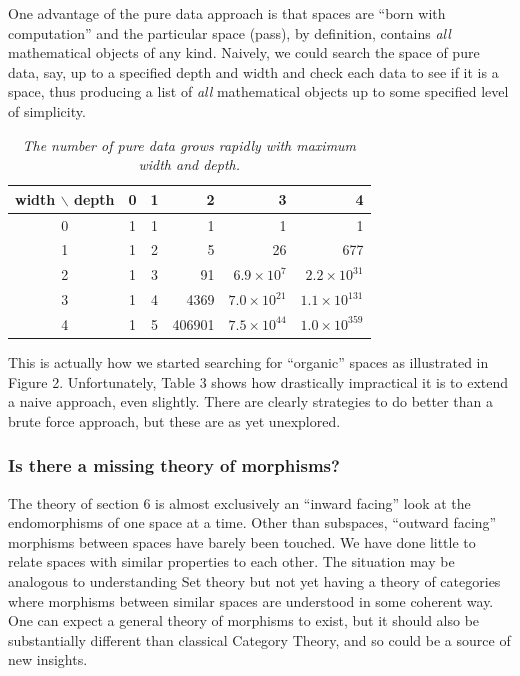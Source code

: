 \documentclass[11pt]{article}
\begin{document}
One advantage of the pure data approach is that spaces are ``born with computation'' and the particular space (pass), by definition,  
contains {\it all} mathematical objects of any kind\cite{coda}.  Naively, we could search the space of pure data, say, up to 
a specified depth and width and check each data to see if it is a space, thus producing a list of {\it all} mathematical objects up to 
some specified level of simplicity.  
\begin{table}[h!]
\centering
\begin{tabular}{c|ccrrr}
\textbf{width} $\backslash$ \textbf{depth} & 0 & 1 & 2 & 3 & 4 \\
\hline
0 & 1 & 1 & 1 & 1 & 1 \\
1 & 1 & 2 & 5 & 26 & 677 \\
2 & 1 & 3 & 91 & $6.9\times 10^{7}$ & $2.2\times 10^{31}$ \\
3 & 1 & 4 & 4369 & $7.0\times 10^{21}$ & $1.1\times 10^{131}$ \\
4 & 1 & 5 & 406901 & $7.5\times 10^{44}$ & $1.0\times 10^{359}$ \\
\end{tabular}
\caption{{\it The number of pure data grows rapidly with maximum width and depth.}}
\label{tab:pure_data_counts}
\end{table}
This is actually how we started searching for ``organic'' spaces as illustrated in Figure 2.  Unfortunately, 
Table 3 shows how drastically impractical it is to extend a naive approach, even slightly.  
There are clearly strategies to do better than a brute force approach, but these are as yet unexplored.  

\subsubsection{Is there a missing theory of morphisms?}

The theory of section 6 is almost exclusively an ``inward facing'' look at the endomorphisms of one space at a time.  Other than 
subspaces, ``outward facing'' morphisms between spaces have barely been touched.  We have done little to relate spaces with 
similar properties to each other.  The situation may be analogous to understanding Set theory but not yet having a theory of categories 
where morphisms between similar spaces are understood in some coherent way.  One can expect a general theory of morphisms to exist, 
but it should also be substantially different than classical Category Theory, and so could be a source of new insights.
\end{document}
